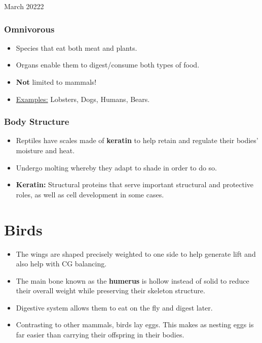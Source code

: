 \documentclass[12pt,oneside]{book} %
\begin{document}
\begin{lec}{March 20222}
  \subsubsection*{Omnivorous}
  \begin{itemize}
    \item Species that eat both meat and plants.
    \item Organs enable them to digest/consume both types of food.
    \item \textbf{Not} limited to mammals!
    \item \underline{Examples:} Lobsters, Dogs, Humans, Bears.
  \end{itemize}
  
  \subsubsection*{Body Structure}
  \begin{itemize}
    \item Reptiles have scales made of \textbf{keratin} to help retain and regulate their bodies' moisture and heat.
    \item Undergo molting whereby they adapt to shade in order to do so.
    \item \textbf{Keratin:} Structural proteins that serve important structural and protective roles, as well as cell development in
    some cases.
  \end{itemize}


  \section*{Birds}
  \begin{itemize}
    \item The wings are shaped precisely weighted to one side to help generate lift and also help with CG balancing.
    \item The main bone known as the \textbf{humerus} is hollow instead of solid to reduce their
    overall weight while preserving their skeleton structure.
    \item Digestive system allows them to eat on the fly and digest later. 
    \item Contrasting to other mammals, birds lay eggs. This makes as nesting eggs is far easier than carrying their
    offspring in their bodies.
  \end{itemize}


\end{lec}
\end{document}
